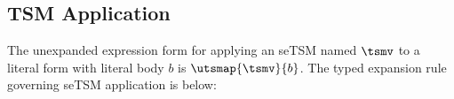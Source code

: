 \documentclass[acmlarge,review,anonymous]{acmart}\settopmatter{printfolios=true}
\begin{document}
\subsection{TSM Application}\label{sec:U-uetsm-application}
The unexpanded expression form for applying an seTSM named $\tsmv$ to a literal form with literal body $b$ is $\utsmap{\tsmv}{b}$. 
The typed expansion rule governing seTSM application is below:
\begin{mathpar}
\end{mathpar}
\end{document}
